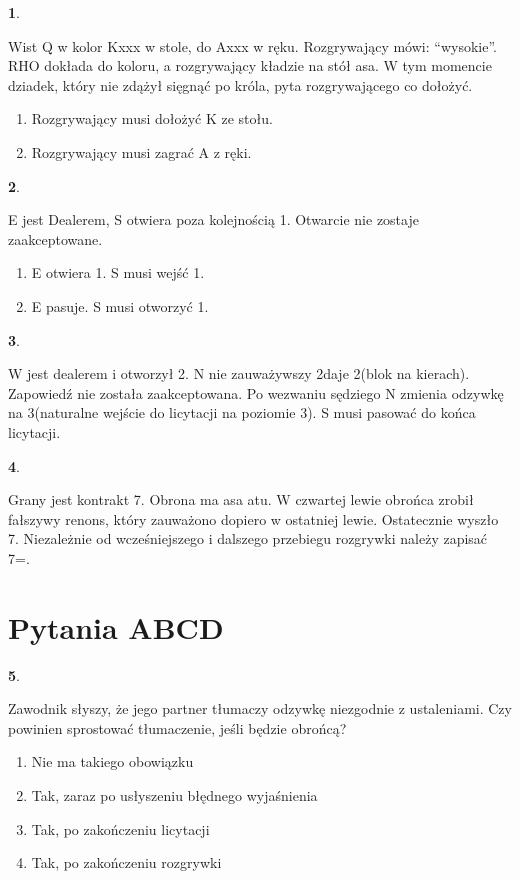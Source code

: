 \documentclass[12pt, a4paper]{article}
\newtheorem{pyt}{}
\begin{document}
\begin{pyt} 
\end{pyt}
Wist \xdiams Q w kolor \xdiams Kxxx w stole, do \xdiams Axxx w ręku. Rozgrywający mówi: “wysokie”. RHO
dokłada do koloru, a rozgrywający kładzie na stół asa. W tym momencie dziadek, który
nie zdążył sięgnąć po króla, pyta rozgrywającego co dołożyć.
\begin{enumerate}[label=\alph*.]
\item Rozgrywający musi dołożyć \xdiams K ze stołu.
\item Rozgrywający musi zagrać \xdiams A z ręki.
\end{enumerate}

\begin{pyt} 
\end{pyt}
E jest Dealerem, S otwiera poza kolejnością 1\hearts. Otwarcie nie zostaje zaakceptowane.
\begin{enumerate}[label=\alph*.]
\item E otwiera 1\clubs. S musi wejść 1\hearts.
\item E pasuje. S musi otworzyć 1\hearts.
\end{enumerate}


\begin{pyt} 
\end{pyt}
W jest dealerem i otworzył 2\nt. N nie zauważywszy 2\nt daje 2\hearts (blok na kierach).
Zapowiedź nie została zaakceptowana. Po wezwaniu sędziego N zmienia odzywkę na
3\hearts (naturalne wejście do licytacji na poziomie 3). S musi pasować do końca licytacji.


\begin{pyt} 
\end{pyt}
Grany jest kontrakt 7\clubs\dbl. Obrona ma asa atu. W czwartej lewie obrońca zrobił fałszywy
renons, który zauważono dopiero w ostatniej lewie. Ostatecznie wyszło 7\clubs{}.
Niezależnie od wcześniejszego i dalszego przebiegu rozgrywki należy zapisać 7\clubs\dbl=.



\pagebreak
\section*{Pytania ABCD}

\begin{pyt} 
\end{pyt}
Zawodnik słyszy, że jego partner tłumaczy odzywkę niezgodnie z ustaleniami. Czy powinien sprostować tłumaczenie, jeśli będzie obrońcą?
\begin{enumerate}[label=\alph*.]
\item Nie ma takiego obowiązku
\item Tak, zaraz po usłyszeniu błędnego wyjaśnienia
\item Tak, po zakończeniu licytacji
\item Tak, po zakończeniu rozgrywki
\end{enumerate}
\end{document}
